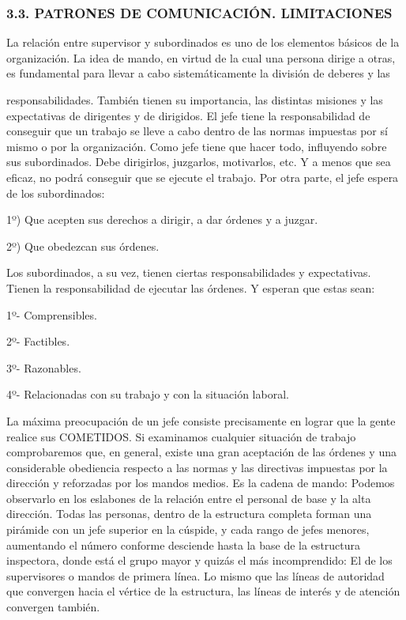 \subsubsection*{3.3. PATRONES DE COMUNICACIÓN. LIMITACIONES}
La relación entre supervisor y subordinados es uno de los elementos básicos de la organización. La idea de mando, en virtud de la cual una persona dirige a otras, es fundamental para llevar a cabo sistemáticamente la división de deberes y las



responsabilidades. También tienen su importancia, las distintas misiones y las expectativas de dirigentes y de dirigidos. El jefe tiene la responsabilidad de conseguir que un trabajo se lleve a cabo dentro de las normas impuestas por sí mismo o por la organización. Como jefe tiene que hacer todo, influyendo sobre sus subordinados. Debe dirigirlos, juzgarlos, motivarlos, etc. Y a menos que sea eficaz, no podrá conseguir que se ejecute el trabajo. Por otra parte, el jefe espera de los subordinados:

1º) Que acepten sus derechos a dirigir, a dar órdenes y a juzgar.

2º) Que obedezcan sus órdenes.

Los subordinados, a su vez, tienen ciertas responsabilidades y expectativas. Tienen la responsabilidad de ejecutar las órdenes. Y esperan que estas sean:

1º- Comprensibles.

2º- Factibles.

3º- Razonables.

4º- Relacionadas con su trabajo y con la situación laboral.

La máxima preocupación de un jefe consiste precisamente en lograr que la gente realice sus COMETIDOS. Si examinamos cualquier situación de trabajo comprobaremos que, en general, existe una gran aceptación de las órdenes y una considerable obediencia respecto a las normas y las directivas impuestas por la dirección y reforzadas por los mandos medios. Es la cadena de mando: Podemos observarlo en los eslabones de la relación entre el personal de base y la alta dirección. Todas las personas, dentro de la estructura completa forman una pirámide con un jefe superior en la cúspide, y cada rango de jefes menores, aumentando el número conforme desciende hasta la base de la estructura inspectora, donde está el grupo mayor y quizás el más incomprendido: El de los supervisores o mandos de primera línea. Lo mismo que las líneas de autoridad que convergen hacia el vértice de la estructura, las líneas de interés y de atención convergen también.

